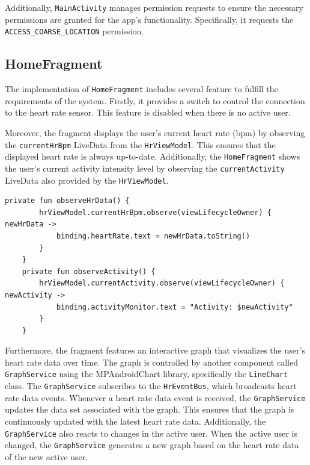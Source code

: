Additionally, \texttt{MainActivity} manages permission requests to ensure the necessary permissions are granted for the app's functionality. Specifically, it requests the \texttt{ACCESS\_COARSE\_LOCATION} permission.

\subsection{HomeFragment}
The implementation of \texttt{HomeFragment} includes several feature to fulfill the requirements of the system. 
Firstly, it provides a switch to control the connection to the heart rate sensor. This feature is disabled when there is no active user.

Moreover, the fragment displays the user's current heart rate (bpm) by observing the \texttt{currentHrBpm} LiveData from the \texttt{HrViewModel}. This ensures that the displayed heart rate is always up-to-date.
Additionally, the \texttt{HomeFragment} shows the user's current activity intensity level by observing the \texttt{currentActivity} LiveData also provided by the \texttt{HrViewModel}. 
\begin{lstlisting}[caption={Observers for currentActivity and currentHrBpm (HomeFragment)}]
    private fun observeHrData() {
        hrViewModel.currentHrBpm.observe(viewLifecycleOwner) { newHrData ->
            binding.heartRate.text = newHrData.toString()
        }
    }
    private fun observeActivity() {
        hrViewModel.currentActivity.observe(viewLifecycleOwner) { newActivity ->
            binding.activityMonitor.text = "Activity: $newActivity"
        }
    }
\end{lstlisting}

Furthermore, the fragment features an interactive graph that visualizes the user's heart rate data over time. 
The graph is controlled by another component called \texttt{GraphService} using the MPAndroidChart library, specifically the \texttt{LineChart} class.
The \texttt{GraphService} subscribes to the \texttt{HrEventBus}, which broadcasts heart rate data events. 
Whenever a heart rate data event is received, the \texttt{GraphService} updates the data set associated with the graph. 
This ensures that the graph is continuously updated with the latest heart rate data.
Additionally, the \texttt{GraphService} also reacts to changes in the active user. 
When the active user is changed, the \texttt{GraphService} generates a new graph based on the heart rate data of the new active user. 

